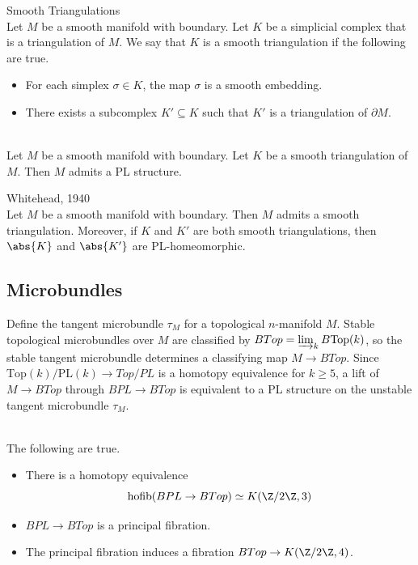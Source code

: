 \documentclass[a4paper]{article}
\begin{document}
\begin{defn}{Smooth Triangulations}{}\\
Let $M$ be a smooth manifold with boundary. Let $K$ be a simplicial complex that is a triangulation of $M$. We say that $K$ is a smooth triangulation if the following are true. 
\begin{itemize}
\item For each simplex $\sigma\in K$, the map $\sigma$ is a smooth embedding. 
\item There exists a subcomplex $K'\subseteq K$ such that $K'$ is a triangulation of $\partial M$. 
\end{itemize}
\end{defn}

\begin{lmm}{}{}\\
Let $M$ be a smooth manifold with boundary. Let $K$ be a smooth triangulation of $M$. Then $M$ admits a PL structure. 
\end{lmm}

\begin{thm}{Whitehead, 1940}{}\\
Let $M$ be a smooth manifold with boundary. Then $M$ admits a smooth triangulation. Moreover, if $K$ and $K'$ are both smooth triangulations, then $\abs{K}$ and $\abs{K'}$ are PL-homeomorphic. 
\end{thm}

\subsection{Microbundles}
Define the tangent microbundle $\tau_M$ for a topological $n$-manifold $M$. Stable topological microbundles over $M$ are classified by $BTop = \varinjlim_k B\mathrm{Top}(k)$, so the stable tangent microbundle determines a classifying map $M \to BTop$. Since $\mathrm{Top}(k)/\mathrm{PL}(k) \to Top/PL$ is a homotopy equivalence for $k \geq 5$, a lift of $M \to BTop$ through $BPL \to BTop$ is equivalent to a PL structure on the unstable tangent microbundle $\tau_M$. 

\begin{lmm}{}{}\\
The following are true. 
\begin{itemize}
\item There is a homotopy equivalence $$\text{hofib}(BPL\to BTop)\simeq K(\Z/2\Z,3)$$
\item $BPL\to BTop$ is a principal fibration.
\item The principal fibration induces a fibration $BTop\to K(\Z/2\Z,4)$. 
\end{itemize}
\end{lmm}
\end{document}
